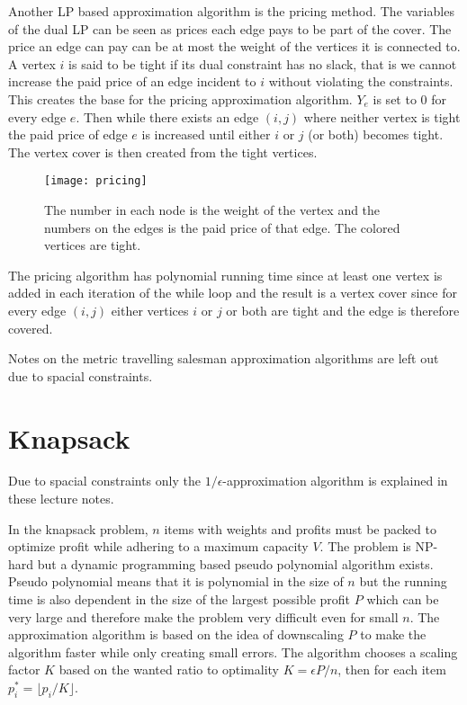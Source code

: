 \newpar Another LP based approximation algorithm is the pricing method. The variables of the dual LP can be seen as prices each edge pays to be part of the cover. The price an edge can pay can be at most the weight of the vertices it is connected to. A vertex $i$ is said to be tight if its dual constraint has no slack, that is we cannot increase the paid price of an edge incident to $i$ without violating the constraints. This creates the base for the pricing approximation algorithm. $Y_e$ is set to 0 for every edge $e$. Then while there exists an edge $(i,j)$ where neither vertex is tight the paid price of edge $e$ is increased until either $i$ or $j$ (or both) becomes tight. The vertex cover is then created from the tight vertices.

\begin{figure}[H]
    \centering
    \texttt{[image: pricing]}
    \caption{The number in each node is the weight of the vertex and the numbers on the edges is the paid price of that edge. The colored vertices are tight.}
\end{figure}

The pricing algorithm has polynomial running time since at least one vertex is added in each iteration of the while loop and the result is a vertex cover since for every edge $(i,j)$ either vertices $i$ or $j$ or both are tight and the edge is therefore covered.

\newpar Notes on the metric travelling salesman approximation algorithms are left out due to spacial constraints.

\section{Knapsack}
Due to spacial constraints only the $1/\epsilon$-approximation algorithm is explained in these lecture notes. 

\newpar In the knapsack problem, $n$ items with weights and profits must be packed to optimize profit while adhering to a maximum capacity $V$. The problem is NP-hard but a dynamic programming based pseudo polynomial algorithm exists. Pseudo polynomial means that it is polynomial in the size of $n$ but the running time is also dependent in the size of the largest possible profit $P$ which can be very large and therefore make the problem very difficult even for small $n$. The approximation algorithm is based on the idea of downscaling $P$ to make the algorithm faster while only creating small errors. The algorithm chooses a scaling factor $K$ based on the wanted ratio to optimality $K=\epsilon P/n$, then for each item $p^*_i = \lfloor p_i/K \rfloor$.

